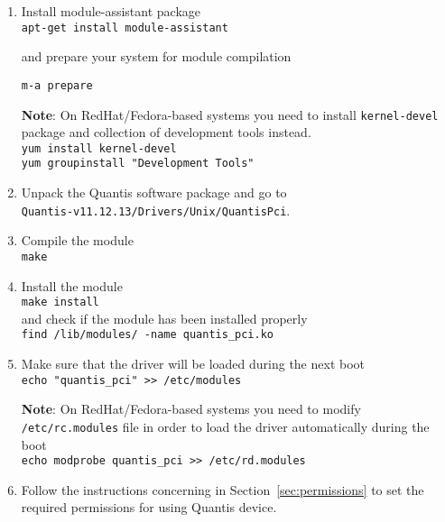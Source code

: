 \documentclass[a4paper,11pt]{article}
\providecommand{\note}[1]{\vspace{6pt}\noindent\textbf{Note}: #1\vspace{6pt}}
\newcommand{\QuantisDistVersion}{Quantis-v11.12.13}
\begin{document}
\begin{enumerate}
    \item Install module-assistant package\\
    \texttt{apt-get install module-assistant}

    and prepare your system for module compilation

    \texttt{m-a prepare}

    \note{On RedHat/Fedora-based systems you need to install
    \texttt{kernel-devel} package and collection of development tools
    instead.}\\ 
    \texttt{yum install kernel-devel} \\
    \texttt{yum groupinstall "Development Tools"}


    \item Unpack the Quantis software package and go to\\
    \texttt{\QuantisDistVersion /Drivers/Unix/QuantisPci}.

    \item Compile the module\\ \texttt{make}

    \item Install the module\\ \texttt{make install}\\ and check if the module
    has been installed properly\\ \texttt{find /lib/modules/ -name
    quantis\_pci.ko}

    \item Make sure that the driver will be loaded during the next boot \\
    \texttt{echo "quantis\_pci" >> /etc/modules}

    \note{On RedHat/Fedora-based systems you need to modify
    \texttt{/etc/rc.modules} file in order to load the driver automatically
    during the boot}\\ \texttt{echo modprobe quantis\_pci >> /etc/rd.modules}

    \item Follow the instructions concerning in Section~\ref{sec:permissions} to
    set the required permissions for using Quantis device.

\end{enumerate}

\end{document}
